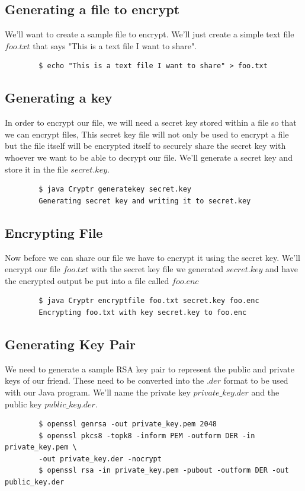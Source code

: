 \documentclass{article}
\begin{document}
\subsection*{Generating a file to encrypt}
We'll want to create a sample file to encrypt. We'll just create a simple text file $foo.txt$ that says "This is a text file I want to share".
\begin{commandline}
	\begin{verbatim}
		$ echo "This is a text file I want to share" > foo.txt
	\end{verbatim}
\end{commandline}

\subsection*{Generating a key}
In order to encrypt our file, we will need a secret key stored within a file so that we can encrypt files, This secret key file will not only be used to encrypt a file but the file itself will be encrypted itself to securely share the secret key with whoever we want to be able to decrypt our file. We'll generate a secret key and store it in the file $secret.key$.
\begin{commandline}
	\begin{verbatim}
		$ java Cryptr generatekey secret.key
		Generating secret key and writing it to secret.key
	\end{verbatim}
\end{commandline}

\subsection*{Encrypting File}
Now before we can share our file we have to encrypt it using the secret key. We'll encrypt our file $foo.txt$ with the secret key file we generated $secret.key$ and have the encrypted output be put into a file called $foo.enc$
\begin{commandline}
	\begin{verbatim}
		$ java Cryptr encryptfile foo.txt secret.key foo.enc
		Encrypting foo.txt with key secret.key to foo.enc
	\end{verbatim}
\end{commandline}

\subsection*{Generating Key Pair}
We need to generate a sample RSA key pair to represent the public and private keys of our friend. These need to be converted into the $.der$ format to be used with our Java program. We'll name the private key $private\_key.der$ and the public key $public\_key.der$.
\begin{commandline}
	\begin{verbatim}
		$ openssl genrsa -out private_key.pem 2048
		$ openssl pkcs8 -topk8 -inform PEM -outform DER -in private_key.pem \
		-out private_key.der -nocrypt
		$ openssl rsa -in private_key.pem -pubout -outform DER -out public_key.der
	\end{verbatim}
\end{commandline}
\end{document}
